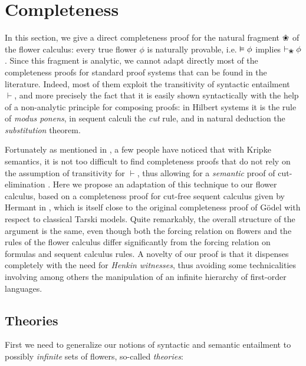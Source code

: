 \section{Completeness}

In this section, we give a direct completeness proof for the natural fragment
$\Nature$ of the flower calculus: every true flower $\phi$ is naturally
provable, i.e. $\vDash \phi$ implies $\vdash_{\Nature} \phi$. Since this
fragment is analytic, we cannot adapt directly most of the completeness proofs
for standard proof systems that can be found in the literature. Indeed, most of
them exploit the transitivity of syntactic entailment $\vdash$, and more
precisely the fact that it is easily shown syntactically with the help of a
non-analytic principle for composing proofs: in Hilbert systems it is the rule
of \emph{modus ponens}, in sequent calculi the \emph{cut} rule, and in natural
deduction the \emph{substitution} theorem.

Fortunately as mentioned in , a few people have noticed that
with Kripke semantics, it is not too difficult to find completeness proofs that
do not rely on the assumption of transitivity for $\vdash$, thus allowing for a
\emph{semantic} proof of cut-elimination
\cite{10.1007/978-3-642-02261-6_17}\cite{ilik:tel-00529021}\cite{hutchison_semantic_2005}.
Here we propose an adaptation of this technique to our flower calculus, based on
a completeness proof for cut-free sequent calculus given by Hermant in
, which is itself close to the original
completeness proof of Gödel with respect to classical Tarski models. Quite
remarkably, the overall structure of the argument is the same, even though both
the forcing relation on flowers and the rules of the flower calculus differ
significantly from the forcing relation on formulas and sequent calculus rules.
A novelty of our proof is that it dispenses completely with the need for
\emph{Henkin witnesses}, thus avoiding some technicalities involving among
others the manipulation of an infinite hierarchy of first-order languages.

\subsection{Theories}

First we need to generalize our notions of syntactic and semantic entailment to
possibly \emph{infinite} sets of flowers, so-called \emph{theories}:

